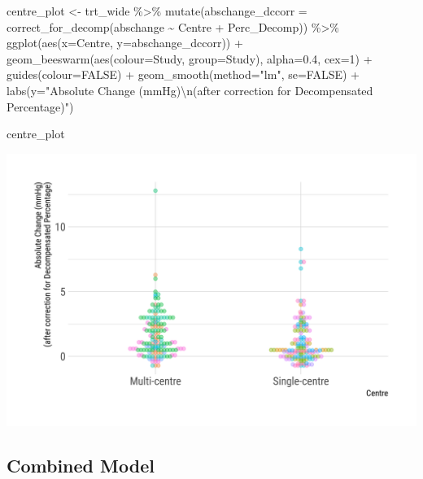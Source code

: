 \documentclass[
]{article}
\newenvironment{Shaded}{\begin{snugshade}}{\end{snugshade}}
\newcommand{\AttributeTok}[1]{\textcolor[rgb]{0.77,0.63,0.00}{#1}}
\newcommand{\ConstantTok}[1]{\textcolor[rgb]{0.00,0.00,0.00}{#1}}
\newcommand{\DecValTok}[1]{\textcolor[rgb]{0.00,0.00,0.81}{#1}}
\newcommand{\FloatTok}[1]{\textcolor[rgb]{0.00,0.00,0.81}{#1}}
\newcommand{\FunctionTok}[1]{\textcolor[rgb]{0.00,0.00,0.00}{#1}}
\newcommand{\NormalTok}[1]{#1}
\newcommand{\OtherTok}[1]{\textcolor[rgb]{0.56,0.35,0.01}{#1}}
\newcommand{\SpecialCharTok}[1]{\textcolor[rgb]{0.00,0.00,0.00}{#1}}
\newcommand{\StringTok}[1]{\textcolor[rgb]{0.31,0.60,0.02}{#1}}
\begin{document}
\begin{Shaded}
\begin{Highlighting}[]
\NormalTok{centre\_plot }\OtherTok{\textless{}{-}}\NormalTok{ trt\_wide }\SpecialCharTok{\%\textgreater{}\%} 
  \FunctionTok{mutate}\NormalTok{(}\AttributeTok{abschange\_dccorr =} \FunctionTok{correct\_for\_decomp}\NormalTok{(abschange }\SpecialCharTok{\textasciitilde{}}\NormalTok{ Centre }\SpecialCharTok{+}\NormalTok{ Perc\_Decomp)) }\SpecialCharTok{\%\textgreater{}\%} 
  \FunctionTok{ggplot}\NormalTok{(}\FunctionTok{aes}\NormalTok{(}\AttributeTok{x=}\NormalTok{Centre, }\AttributeTok{y=}\NormalTok{abschange\_dccorr)) }\SpecialCharTok{+}
  \FunctionTok{geom\_beeswarm}\NormalTok{(}\FunctionTok{aes}\NormalTok{(}\AttributeTok{colour=}\NormalTok{Study, }\AttributeTok{group=}\NormalTok{Study), }\AttributeTok{alpha=}\FloatTok{0.4}\NormalTok{, }\AttributeTok{cex=}\DecValTok{1}\NormalTok{) }\SpecialCharTok{+}
  \FunctionTok{guides}\NormalTok{(}\AttributeTok{colour=}\ConstantTok{FALSE}\NormalTok{) }\SpecialCharTok{+} 
  \FunctionTok{geom\_smooth}\NormalTok{(}\AttributeTok{method=}\StringTok{"lm"}\NormalTok{, }\AttributeTok{se=}\ConstantTok{FALSE}\NormalTok{) }\SpecialCharTok{+}
  \FunctionTok{labs}\NormalTok{(}\AttributeTok{y=}\StringTok{"Absolute Change (mmHg)}\SpecialCharTok{\textbackslash{}n}\StringTok{(after correction for Decompensated Percentage)"}\NormalTok{)}

\NormalTok{centre\_plot}
\end{Highlighting}
\end{Shaded}

\includegraphics{figures/unnamed-chunk-40-1.png}

\hypertarget{combined-model}{%
\subsection{Combined Model}\label{combined-model}}
\end{document}
